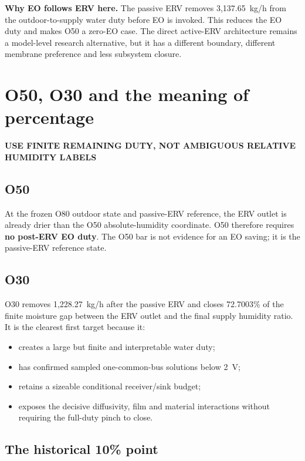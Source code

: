 \documentclass[10pt,a4paper]{article}
\newcommand{\sans}{\fontfamily{qhv}\selectfont}
\newcommand{\eyebrow}[1]{%
  {\sans\bfseries\color{Teal}\MakeUppercase{#1}}\par\vspace{1.5mm}%
}
\begin{document}
\begin{plainbox}
\textbf{Why EO follows ERV here.} The passive ERV removes 3,137.65~kg/h from
the outdoor-to-supply water duty before EO is invoked. This reduces the EO
duty and makes O50 a zero-EO case. The direct active-ERV architecture remains
a model-level research alternative, but it has a different boundary,
different membrane preference and less subsystem closure.
\end{plainbox}

\section{O50, O30 and the meaning of percentage}
\eyebrow{Use finite remaining duty, not ambiguous relative humidity labels}

\subsection{O50}

At the frozen O80 outdoor state and passive-ERV reference, the ERV outlet is
already drier than the O50 absolute-humidity coordinate. O50 therefore
requires \textbf{no post-ERV EO duty}. The O50 bar is not evidence for an EO
saving; it is the passive-ERV reference state.

\subsection{O30}

O30 removes 1,228.27~kg/h after the passive ERV and closes 72.7003\% of the
finite moisture gap between the ERV outlet and the final supply humidity
ratio. It is the clearest first target because it:
\begin{itemize}
  \item creates a large but finite and interpretable water duty;
  \item has confirmed sampled one-common-bus solutions below 2~V;
  \item retains a sizeable conditional receiver/sink budget;
  \item exposes the decisive diffusivity, film and material interactions
        without requiring the full-duty pinch to close.
\end{itemize}

\subsection{The historical 10\% point}
\end{document}
